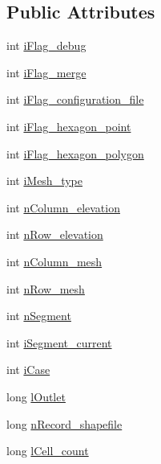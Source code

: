\subsection*{Public Attributes}
\begin{DoxyCompactItemize}
\item 
int \hyperlink{classhexwatershed_1_1domain_aec8e60df7b635db51d0be1eedb99e3b1}{i\-Flag\-\_\-debug}
\item 
int \hyperlink{classhexwatershed_1_1domain_aab3d8698d380781b36bcfc0baaccc1d6}{i\-Flag\-\_\-merge}
\item 
int \hyperlink{classhexwatershed_1_1domain_a068c98debccd44c5eb543b2c06b90d8e}{i\-Flag\-\_\-configuration\-\_\-file}
\item 
int \hyperlink{classhexwatershed_1_1domain_a38c815a5e615239fa0fba0b3d04109d9}{i\-Flag\-\_\-hexagon\-\_\-point}
\item 
int \hyperlink{classhexwatershed_1_1domain_ad3d2e6910dc27d36b61fb4c0998f006f}{i\-Flag\-\_\-hexagon\-\_\-polygon}
\item 
int \hyperlink{classhexwatershed_1_1domain_a8f921593736177839989703e6e891c8e}{i\-Mesh\-\_\-type}
\item 
int \hyperlink{classhexwatershed_1_1domain_a7622ea5cc85456fa046c78105d98fcc6}{n\-Column\-\_\-elevation}
\item 
int \hyperlink{classhexwatershed_1_1domain_ad350abd8fce9e42e628821479dd495c7}{n\-Row\-\_\-elevation}
\item 
int \hyperlink{classhexwatershed_1_1domain_a67a496a610896ea4cb699326d7e68542}{n\-Column\-\_\-mesh}
\item 
int \hyperlink{classhexwatershed_1_1domain_ab4ae9021b585b50c97395e2caf3d35a4}{n\-Row\-\_\-mesh}
\item 
int \hyperlink{classhexwatershed_1_1domain_a8a0d4931851da051b0b38f10b8df13fe}{n\-Segment}
\item 
int \hyperlink{classhexwatershed_1_1domain_a09d29ab3c105e41f28f6d88a66f372d0}{i\-Segment\-\_\-current}
\item 
int \hyperlink{classhexwatershed_1_1domain_acfef0358941f910f3f6ac141e82b1f70}{i\-Case}
\item 
long \hyperlink{classhexwatershed_1_1domain_ad9678605c1dae376003cb5b435a498da}{l\-Outlet}
\item 
long \hyperlink{classhexwatershed_1_1domain_ad760e386909941278c649b5e93fa8a3a}{n\-Record\-\_\-shapefile}
\item 
long \hyperlink{classhexwatershed_1_1domain_acb549889c20abf5221562f5ff78c9ecf}{l\-Cell\-\_\-count}

\end{DoxyCompactItemize}

